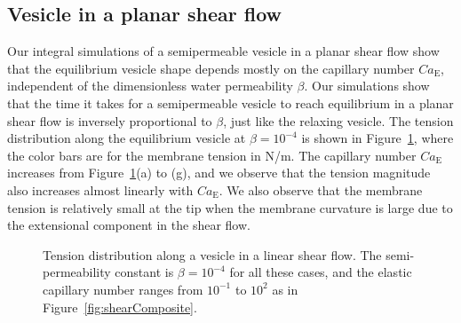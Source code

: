 \documentclass[9pt,twocolumn,twoside,lineno]{pnas-new}
\begin{document}
\subsection*{Vesicle in a planar shear flow}
Our integral simulations of a semipermeable vesicle in a planar shear flow show that the equilibrium
vesicle shape depends mostly on the capillary number $Ca_\mathrm{E}$, independent of the dimensionless water permeability $\beta$.
Our simulations show that the time it takes for a semipermeable vesicle to reach equilibrium in a planar shear flow is inversely proportional to $\beta$, just like the relaxing vesicle.
The tension distribution along the equilibrium vesicle at $\beta=10^{-4}$ is shown in Figure~\ref{fig:shearTensions}, where the color bars are for the membrane tension in N/m.
The capillary number $Ca_\mathrm{E}$ increases from Figure~\ref{fig:shearTensions}(a) to (g), and we observe that the tension magnitude also increases almost linearly with
$Ca_\mathrm{E}$.  We also observe that the membrane tension is relatively small at the tip when the membrane curvature is large due to the extensional component in the shear flow.
\begin{figure}[hbp]
  \caption{\label{fig:shearTensions} Tension distribution along a vesicle in
  a linear shear flow. The semi-permeability constant is $\beta = 10^{-4}$ for
  all these cases, and the elastic capillary number ranges from
  $10^{-1}$ to $10^{2}$ as in Figure~\ref{fig:shearComposite}.}
\end{figure}
\end{document}
